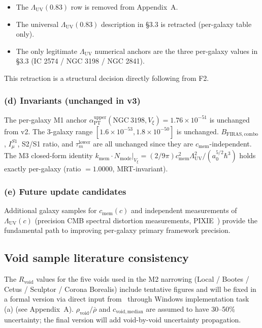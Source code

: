 \documentclass[11pt,a4paper]{article}
\newcommand{\kmem}{k_{\mathrm{mem}}}
\newcommand{\cmem}{c_{\mathrm{mem}}}
\newcommand{\Vxi}{V_{\xi}}
\newcommand{\Nmode}{N_{\mathrm{mode}}}
\newcommand{\aPT}{\alpha_{\mathrm{PT}}}
\newcommand{\taum}{\tau_{m}}
\newcommand{\Imu}{I_{\mu}}
\newcommand{\BFIRAS}{B_{\mathrm{FIRAS,combo}}}
\newcommand{\Lambdauv}{\Lambda_{\mathrm{UV}}}
\newcommand{\Rvoid}{R_{\mathrm{void}}}
\begin{document}
\begin{itemize}
\item The $\Lambdauv(0.83)$ row is removed from Appendix~A.
\item The universal $\Lambdauv(0.83)$ description in \S 3.3 is retracted (per-galaxy table only).
\item The only legitimate $\Lambdauv$ numerical anchors are the three per-galaxy values in
      \S 3.3 (IC 2574 / NGC 3198 / NGC 2841).
\end{itemize}

This retraction is a structural decision directly following from F2.

\subsubsection*{(d) Invariants (unchanged in v3)}

The per-galaxy M1 anchor $\aPT^{\mathrm{upper}}(\mathrm{NGC~3198}, \Vxi) = 1.76 \times 10^{-51}$
is unchanged from v2. The 3-galaxy range $[1.6\times10^{-53}, 1.8\times10^{-50}]$ is unchanged.
$\BFIRAS$, $\Imu^{S1}$, S2/S1 ratio, and $\taum^{\mathrm{lower}}$ are all unchanged since they
are $\cmem$-independent. The M3 closed-form identity
$\kmem \cdot \Nmode|_{\Vxi} = (2/9\pi) \cmem^2 \Lambdauv^2/(a_0^{5/2}\hbar^3)$ holds exactly
per-galaxy (ratio $= 1.0000$, MRT-invariant).

\subsubsection*{(e) Future update candidates}

Additional galaxy samples for $\cmem(c)$ and independent measurements of $\Lambdauv(c)$
(precision CMB spectral distortion measurements, PIXIE~\citep{Kogut2011}) provide the
fundamental path to improving per-galaxy primary framework precision.

\subsection{Void sample literature consistency}
The $\Rvoid$ values for the five voids used in the M2 narrowing (Local / Bootes / Cetus /
Sculptor / Corona Borealis) include tentative figures and will be fixed in a formal version via
direct input from~\citet{Kreckel2011, Pan2012, Ricciardelli2014} through Windows implementation
task (a) (see Appendix~A). $\rho_{\mathrm{void}}/\bar{\rho}$ and $c_{\mathrm{void,median}}$ are
assumed to have 30--50\% uncertainty; the final version will add void-by-void uncertainty
propagation.
\end{document}

